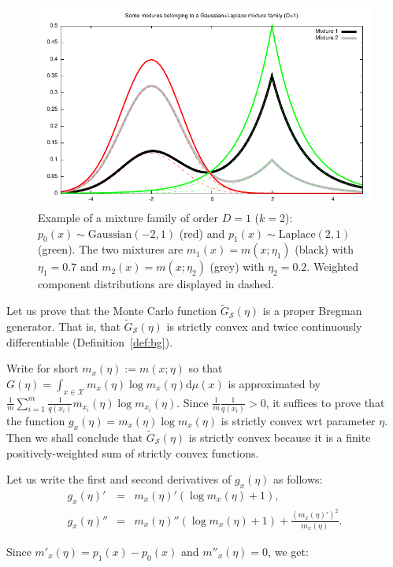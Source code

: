\documentclass[graybox]{svmult}
\def\dmu{\mathrm{d}\mu}
\def\eqdef{:=}
\def\tildeG{\tilde{G}}
\def\calS{\mathcal{S}}
\def\calX{\mathcal{X}}
\begin{document}
\begin{figure}%
\centering
\includegraphics[width=0.85\columnwidth]{wLaplaceGaussian.pdf}%

\caption{Example of a mixture family of order $D=1$ ($k=2$): $p_0(x)\sim \mathrm{Gaussian}(-2,1)$ (red) and $p_1(x)\sim \mathrm{Laplace}(2,1)$ (green). 
The two mixtures are $m_1(x)=m(x;\eta_1)$ (black) with $\eta_1=0.7$ and $m_2(x)=m(x;\eta_2)$ (grey) with $\eta_2=0.2$. Weighted component distributions  are displayed in dashed.
 }%
\label{fig:mmexample}%
\end{figure}

 
Let us prove that the Monte Carlo function $\tildeG_\calS(\eta)$ is a proper Bregman generator.
That is, that  $\tildeG_\calS(\eta)$ is strictly convex and twice continuously differentiable (Definition~\ref{def:bg}).

Write for short $m_x(\eta) \eqdef m(x;\eta)$ so that $G(\eta)=\int_{x\in\calX} m_x(\eta)\log m_x(\eta)\dmu(x)$ is 
approximated by  $\frac{1}{m} \sum_{i=1}^m  \frac{1}{q(x_i)} m_{x_i}(\eta)\log m_{x_i}(\eta)$.
Since $\frac{1}{m} \frac{1}{q(x_i)}>0$, it suffices to prove that the  function $g_x(\eta)=m_{x}(\eta)\log m_{x}(\eta)$ is strictly convex wrt parameter $\eta$.
Then we shall conclude that $\tildeG_\calS(\eta)$ is strictly convex because it is a finite positively-weighted sum of strictly convex functions.

Let us write the first and second derivatives of $g_x(\eta)$ as follows:
\begin{eqnarray}
g_x(\eta)' &=&m_{x}(\eta)'(\log m_{x}(\eta)+1),\\
g_x(\eta)'' &=& m_{x}(\eta)''(\log m_{x}(\eta)+1)+\frac{(m_{x}(\eta)')^2}{m_{x}(\eta)}.
\end{eqnarray}

Since $m'_x(\eta)=p_1(x)-p_0(x)$ and $m''_x(\eta)=0$, we get:
\end{document}
